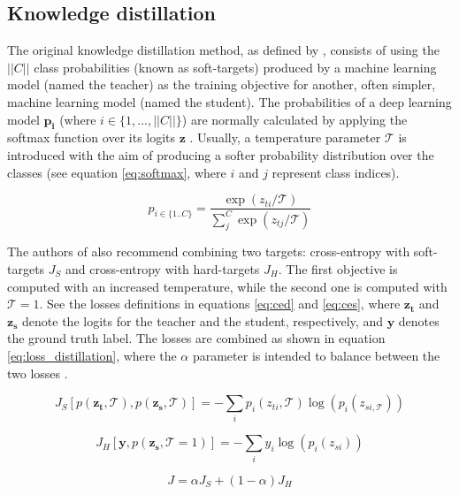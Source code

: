\subsection{Knowledge distillation} \label{sec:distillation_kd}
The original knowledge distillation method, as defined by \autocite{hinton2015}, consists of using the $||C||$ class probabilities (known as soft-targets) produced by a machine learning model (named the teacher) as the training objective for another, often simpler, machine learning model (named the student). The probabilities of a deep learning model $\mathbf{p_i}$ (where $i \in \{1,...,||C||\}$) are normally calculated by applying the softmax function over its logits $\mathbf{z}$ \autocite{Goodfellow2016}. Usually, a temperature parameter $\mathcal{T}$ is introduced with the aim of producing a softer probability distribution over the classes (see equation \ref{eq:softmax}, where $i$ and $j$ represent class indices).

\begin{equation}
p_{i \in \{1 .. C\}} = \frac{\exp(z_{ti}/\mathcal{T})}{\sum_j^C \exp(z_{tj}/\mathcal{T})}
\label{eq:softmax}
\end{equation}

The authors of \autocite{hinton2015} also recommend combining two targets: cross-entropy with soft-targets $J_S$ and cross-entropy with hard-targets  $J_H$. The first objective is computed with an increased temperature, while the second one is computed with $\mathcal{T}=1$. See the losses definitions in equations \ref{eq:ced} and \ref{eq:ces}, where $\mathbf{z_t}$ and $\mathbf{z_s}$ denote the logits for the teacher and the student, respectively, and $\mathbf{y}$ denotes the ground truth label. The losses are combined as shown in equation \ref{eq:loss_distillation}, where the $\alpha$ parameter is intended to balance between the two losses \autocite{gou2020}.

\begin{equation}
J_S\left[p( \mathbf{z_t}, \mathcal{T}), p(\mathbf{z_s},\mathcal{T}) \right] = -\sum_i p_i(z_{ti}, \mathcal{T}) \log \left(p_i(z_{si, \mathcal{T}})\right)
\label{eq:ced}
\end{equation}

\begin{equation}
J_{H}\left[\mathbf{y}, p(\mathbf{z_s}, \mathcal{T}=1) \right] = -\sum_i y_i \log \left(p_i(z_{si})\right)
\label{eq:ces}
\end{equation}

\begin{equation}
J = \alpha J_S + (1-\alpha) J_{H}
\label{eq:loss_distillation}
\end{equation}

